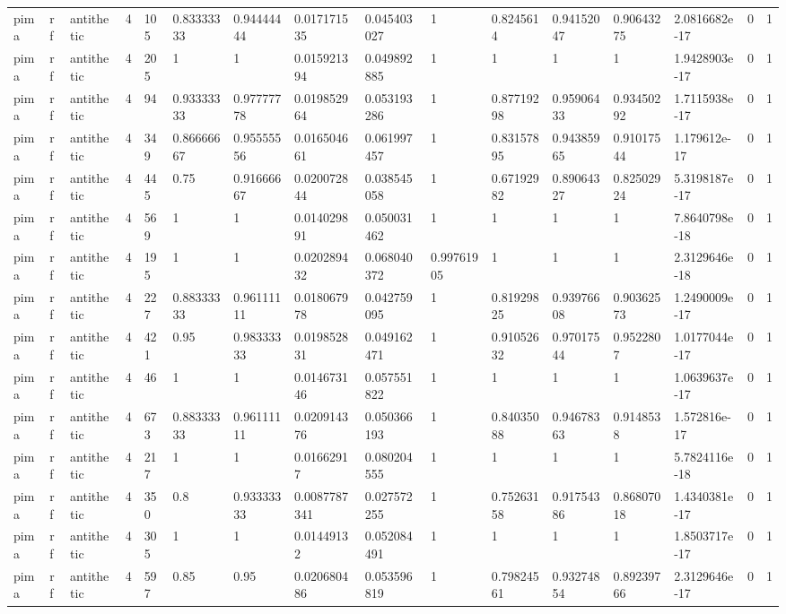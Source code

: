 \begin{tabular}{llllllllllllllll}
pima & rf & antithetic & 4 & 105 & 0.83333333 & 0.94444444 & 0.017171535 & 0.045403027 & 1 & 0.8245614 & 0.94152047 & 0.90643275 & 2.0816682e-17 & 0 & 1 \\
pima & rf & antithetic & 4 & 205 & 1 & 1 & 0.015921394 & 0.049892885 & 1 & 1 & 1 & 1 & 1.9428903e-17 & 0 & 1 \\
pima & rf & antithetic & 4 & 94 & 0.93333333 & 0.97777778 & 0.019852964 & 0.053193286 & 1 & 0.87719298 & 0.95906433 & 0.93450292 & 1.7115938e-17 & 0 & 1 \\
pima & rf & antithetic & 4 & 349 & 0.86666667 & 0.95555556 & 0.016504661 & 0.061997457 & 1 & 0.83157895 & 0.94385965 & 0.91017544 & 1.179612e-17 & 0 & 1 \\
pima & rf & antithetic & 4 & 445 & 0.75 & 0.91666667 & 0.020072844 & 0.038545058 & 1 & 0.67192982 & 0.89064327 & 0.82502924 & 5.3198187e-17 & 0 & 1 \\
pima & rf & antithetic & 4 & 569 & 1 & 1 & 0.014029891 & 0.050031462 & 1 & 1 & 1 & 1 & 7.8640798e-18 & 0 & 1 \\
pima & rf & antithetic & 4 & 195 & 1 & 1 & 0.020289432 & 0.068040372 & 0.99761905 & 1 & 1 & 1 & 2.3129646e-18 & 0 & 1 \\
pima & rf & antithetic & 4 & 227 & 0.88333333 & 0.96111111 & 0.018067978 & 0.042759095 & 1 & 0.81929825 & 0.93976608 & 0.90362573 & 1.2490009e-17 & 0 & 1 \\
pima & rf & antithetic & 4 & 421 & 0.95 & 0.98333333 & 0.019852831 & 0.049162471 & 1 & 0.91052632 & 0.97017544 & 0.9522807 & 1.0177044e-17 & 0 & 1 \\
pima & rf & antithetic & 4 & 46 & 1 & 1 & 0.014673146 & 0.057551822 & 1 & 1 & 1 & 1 & 1.0639637e-17 & 0 & 1 \\
pima & rf & antithetic & 4 & 673 & 0.88333333 & 0.96111111 & 0.020914376 & 0.050366193 & 1 & 0.84035088 & 0.94678363 & 0.9148538 & 1.572816e-17 & 0 & 1 \\
pima & rf & antithetic & 4 & 217 & 1 & 1 & 0.01662917 & 0.080204555 & 1 & 1 & 1 & 1 & 5.7824116e-18 & 0 & 1 \\
pima & rf & antithetic & 4 & 350 & 0.8 & 0.93333333 & 0.0087787341 & 0.027572255 & 1 & 0.75263158 & 0.91754386 & 0.86807018 & 1.4340381e-17 & 0 & 1 \\
pima & rf & antithetic & 4 & 305 & 1 & 1 & 0.01449132 & 0.052084491 & 1 & 1 & 1 & 1 & 1.8503717e-17 & 0 & 1 \\
pima & rf & antithetic & 4 & 597 & 0.85 & 0.95 & 0.020680486 & 0.053596819 & 1 & 0.79824561 & 0.93274854 & 0.89239766 & 2.3129646e-17 & 0 & 1 \\

\end{tabular}
